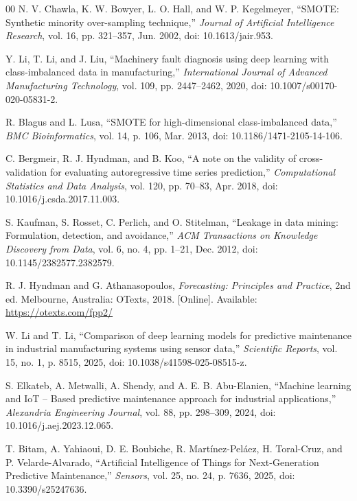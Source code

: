 \documentclass[conference]{IEEEtran}
\begin{document}
\begin{thebibliography}{00}
N. V. Chawla, K. W. Bowyer, L. O. Hall, and W. P. Kegelmeyer, ``SMOTE: Synthetic minority over-sampling technique,'' \textit{Journal of Artificial Intelligence Research}, vol. 16, pp. 321--357, Jun. 2002, doi: 10.1613/jair.953.

Y. Li, T. Li, and J. Liu, ``Machinery fault diagnosis using deep learning with class-imbalanced data in manufacturing,'' \textit{International Journal of Advanced Manufacturing Technology}, vol. 109, pp. 2447--2462, 2020, doi: 10.1007/s00170-020-05831-2.

R. Blagus and L. Lusa, ``SMOTE for high-dimensional class-imbalanced data,'' \textit{BMC Bioinformatics}, vol. 14, p. 106, Mar. 2013, doi: 10.1186/1471-2105-14-106.

C. Bergmeir, R. J. Hyndman, and B. Koo, ``A note on the validity of cross-validation for evaluating autoregressive time series prediction,'' \textit{Computational Statistics and Data Analysis}, vol. 120, pp. 70--83, Apr. 2018, doi: 10.1016/j.csda.2017.11.003.

S. Kaufman, S. Rosset, C. Perlich, and O. Stitelman, ``Leakage in data mining: Formulation, detection, and avoidance,'' \textit{ACM Transactions on Knowledge Discovery from Data}, vol. 6, no. 4, pp. 1--21, Dec. 2012, doi: 10.1145/2382577.2382579.

R. J. Hyndman and G. Athanasopoulos, \textit{Forecasting: Principles and Practice}, 2nd ed. Melbourne, Australia: OTexts, 2018. [Online]. Available: \url{https://otexts.com/fpp2/}

W. Li and T. Li, ``Comparison of deep learning models for predictive maintenance in industrial manufacturing systems using sensor data,'' \textit{Scientific Reports}, vol. 15, no. 1, p. 8515, 2025, doi: 10.1038/s41598-025-08515-z.

S. Elkateb, A. Metwalli, A. Shendy, and A. E. B. Abu-Elanien, ``Machine learning and IoT – Based predictive maintenance approach for industrial applications,'' \textit{Alexandria Engineering Journal}, vol. 88, pp. 298--309, 2024, doi: 10.1016/j.aej.2023.12.065.

T. Bitam, A. Yahiaoui, D. E. Boubiche, R. Martínez-Peláez, H. Toral-Cruz, and P. Velarde-Alvarado, ``Artificial Intelligence of Things for Next-Generation Predictive Maintenance,'' \textit{Sensors}, vol. 25, no. 24, p. 7636, 2025, doi: 10.3390/s25247636.


\end{thebibliography}
\end{document}
